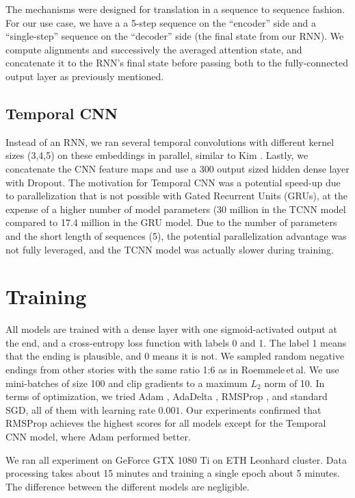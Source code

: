 \documentclass{article}
\begin{document}
The mechanisms were designed for translation in a sequence to sequence fashion. For our use case, we have a a 5-step sequence on the ``encoder'' side and a ``single-step'' sequence on the ``decoder'' side (the final state from our RNN). We compute alignments and successively the averaged attention state, and concatenate it to the RNN's final state before passing both to the fully-connected output layer as previously mentioned.

\subsection{Temporal CNN}
Instead of an RNN, we ran several temporal convolutions with different kernel sizes (3,4,5) on these embeddings in parallel, similar to Kim \citep{Kim2014ConvolutionalClassification}. Lastly, we concatenate the CNN feature maps and use a 300 output sized hidden dense layer with Dropout. The motivation for Temporal CNN was a potential speed-up due to parallelization that is not possible with Gated Recurrent Units (GRUs), at the expense of a higher number of model parameters (30 million in the TCNN model compared to 17.4 million in the GRU model. Due to the number of parameters and the short length of sequences (5), the potential parallelization advantage was not fully leveraged, and the TCNN model was actually slower during training.



\section{Training}\label{sec:training}
All models are trained with a dense layer with one sigmoid-activated output at the end, and a cross-entropy loss function with labels 0 and 1. The label 1 means that the ending is plausible, and 0 means it is not. We sampled random negative endings from other stories with the same ratio 1:6 as in Roemmele\,et\,al. We use mini-batches of size 100 and clip gradients to a maximum $L_2$ norm of 10. In terms of optimization, we tried Adam \citep{Kingma2015}, AdaDelta \citep{Zeiler2012ADADELTA:Method}, RMSProp \citep{HintonNeuralDescent}, and standard SGD, all of them with learning rate $0.001$. Our experiments confirmed that RMSProp \citep{HintonNeuralDescent} achieves the highest scores for all models except for the Temporal CNN model, where Adam performed better.

We ran all experiment on GeForce GTX 1080 Ti on ETH Leonhard cluster. Data processing takes about 15 minutes and training a single epoch about 5 minutes. The difference between the different models are negligible.
\end{document}
